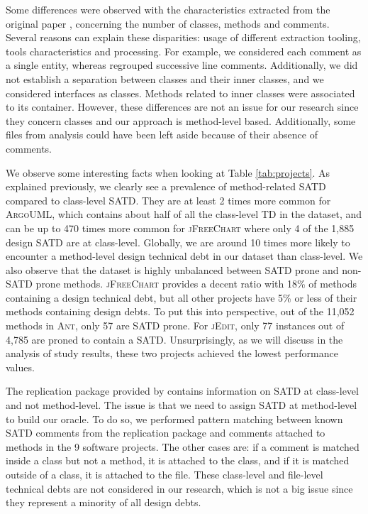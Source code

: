 Some differences were observed with the characteristics extracted from the original paper \citep{maldonado17}, concerning the number of classes, methods and comments. Several reasons can explain these disparities: usage of different extraction tooling, tools characteristics and processing. For example, we considered each comment as a single entity, whereas \citet{maldonado17} regrouped successive line comments. Additionally, we did not establish a separation between classes and their inner classes, and we considered interfaces as classes. Methods related to inner classes were associated to its container. However, these differences are not an issue for our research since they concern classes and our approach is method-level based. Additionally, some files from \citet{maldonado17} analysis could have been left aside because of their absence of comments. \par 

We observe some interesting facts when looking at Table \ref{tab:projects}. As explained previously, we clearly see a prevalence of method-related \ac{SATD} compared to class-level \ac{SATD}. They are at least 2 times more common for \textsc{ArgoUML}, which contains about half of all the class-level \ac{TD} in the dataset, and can be up to 470 times more common for \textsc{jFreeChart} where only 4 of the 1,885 design \ac{SATD} are at class-level. Globally, we are around 10 times more likely to encounter a method-level design technical debt in our dataset than class-level. We also observe that the dataset is highly unbalanced between \ac{SATD} prone and non-\ac{SATD} prone methods. \textsc{jFreeChart} provides a decent ratio with 18\% of methods containing a design technical debt, but all other projects have 5\% or less of their methods containing design debts. To put this into perspective, out of the 11,052 methods in \textsc{Ant}, only 57 are \ac{SATD} prone. For \textsc{jEdit}, only 77 instances out of 4,785 are proned to contain a \ac{SATD}. Unsurprisingly, as we will discuss in the analysis of study results, these two projects achieved the lowest performance values. \par 

The replication package provided by \citet{maldonado17} contains information on \ac{SATD} at class-level and not method-level. The issue is that we need to assign \ac{SATD} at method-level to build our oracle. To do so, we performed pattern matching between known \ac{SATD} comments from the replication package and comments attached to methods in the 9 software projects. The other cases are: if a comment is matched inside a class but not a method, it is attached to the class, and if it is matched outside of a class, it is attached to the file. These class-level and file-level technical debts are not considered in our research, which is not a big issue since they represent a minority of all design debts.

